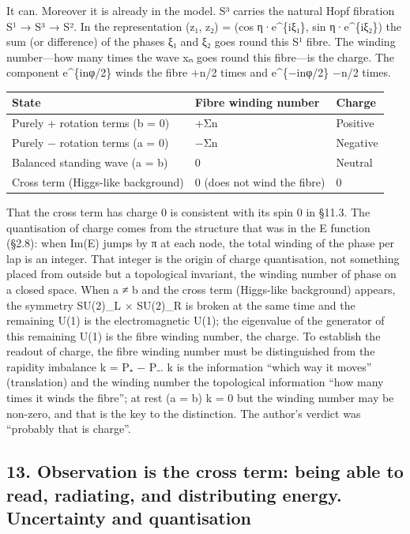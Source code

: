 \documentclass[
  a4paper,
]{article}
\newcounter{none} %
\begin{document}
It can. Moreover it is already in the model. S³ carries the natural Hopf
fibration S¹ → S³ → S². In the representation (z₁, z₂) = (cos
η·e\^{}\{iξ₁\}, sin η·e\^{}\{iξ₂\}) the sum (or difference) of the
phases ξ₁ and ξ₂ goes round this S¹ fibre. The winding number---how many
times the wave xₙ goes round this fibre---is the charge. The component
e\^{}\{inφ/2\} winds the fibre +n/2 times and e\^{}\{−inφ/2\} −n/2
times.

{\def\LTcaptype{none} %
\begin{longtable}[]{@{}lll@{}}
\toprule\noalign{}
State & Fibre winding number & Charge \\
\midrule\noalign{}
\endhead
\bottomrule\noalign{}
\endlastfoot
Purely + rotation terms (b = 0) & +Σn & Positive \\
Purely − rotation terms (a = 0) & −Σn & Negative \\
Balanced standing wave (a = b) & 0 & Neutral \\
Cross term (Higgs-like background) & 0 (does not wind the fibre) & 0 \\
\end{longtable}
}

That the cross term has charge 0 is consistent with its spin 0 in §11.3.
The quantisation of charge comes from the structure that was in the E
function (§2.8): when Im(E) jumps by π at each node, the total winding
of the phase per lap is an integer. That integer is the origin of charge
quantisation, not something placed from outside but a topological
invariant, the winding number of phase on a closed space. When a ≠ b and
the cross term (Higgs-like background) appears, the symmetry SU(2)\_L ×
SU(2)\_R is broken at the same time and the remaining U(1) is the
electromagnetic U(1); the eigenvalue of the generator of this remaining
U(1) is the fibre winding number, the charge. To establish the readout
of charge, the fibre winding number must be distinguished from the
rapidity imbalance k = P₊ − P₋. k is the information ``which way it
moves'' (translation) and the winding number the topological information
``how many times it winds the fibre''; at rest (a = b) k = 0 but the
winding number may be non-zero, and that is the key to the distinction.
The author's verdict was ``probably that is charge''.

\subsection{13. Observation is the cross term: being able to read,
radiating, and distributing energy. Uncertainty and
quantisation}\label{observation-is-the-cross-term-being-able-to-read-radiating-and-distributing-energy.-uncertainty-and-quantisation}
\end{document}
